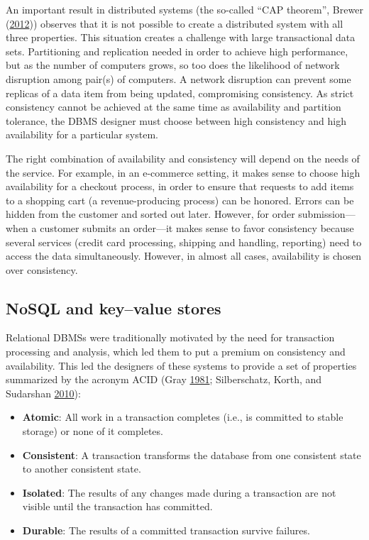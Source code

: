 \documentclass[]{krantz}
\begin{document}
An important result in distributed systems (the so-called ``CAP
theorem'', Brewer (\protect\hyperlink{ref-brewer2012cap}{2012}))
observes that it is not possible to create a distributed system with all
three properties. This situation creates a challenge with large
transactional data sets. Partitioning and replication needed in order to
achieve high performance, but as the number of computers grows, so too
does the likelihood of network disruption among pair(s) of computers. A
network disruption can prevent some replicas of a data item from being
updated, compromising consistency. As strict consistency cannot be
achieved at the same time as availability and partition tolerance, the
DBMS designer must choose between high consistency and high availability
for a particular system.

The right combination of availability and consistency will depend on the
needs of the service. For example, in an e-commerce setting, it makes
sense to choose high availability for a checkout process, in order to
ensure that requests to add items to a shopping cart (a
revenue-producing process) can be honored. Errors can be hidden from the
customer and sorted out later. However, for order submission---when a
customer submits an order---it makes sense to favor consistency because
several services (credit card processing, shipping and handling,
reporting) need to access the data simultaneously. However, in almost
all cases, availability is chosen over consistency.

\subsection{NoSQL and key--value
stores}\label{nosql-and-keyvalue-stores}

Relational DBMSs were traditionally motivated by the need for
transaction processing and analysis, which led them to put a premium on
consistency and availability. This led the designers of these systems to
provide a set of properties summarized by the acronym ACID (Gray
\protect\hyperlink{ref-gray1981transaction}{1981}; Silberschatz, Korth,
and Sudarshan \protect\hyperlink{ref-silberschatz2010database}{2010}):

\begin{itemize}
\item
  \textbf{Atomic}: All work in a transaction completes (i.e., is
  committed to stable storage) or none of it completes.
\item
  \textbf{Consistent}: A transaction transforms the database from one
  consistent state to another consistent state.
\item
  \textbf{Isolated}: The results of any changes made during a
  transaction are not visible until the transaction has committed.
\item
  \textbf{Durable}: The results of a committed transaction survive
  failures.
\end{itemize}
\end{document}

